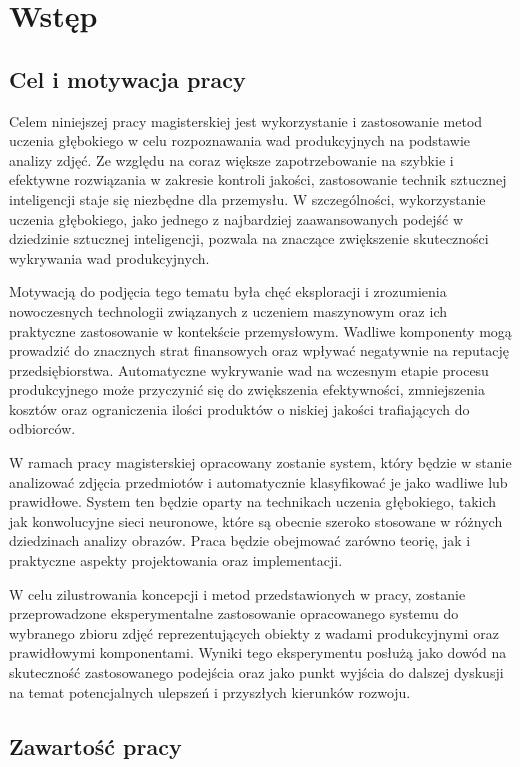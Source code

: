 \chapter{Wstęp}
\section{Cel i motywacja pracy}

Celem niniejszej pracy magisterskiej jest wykorzystanie i zastosowanie metod uczenia głębokiego w celu rozpoznawania wad produkcyjnych na podstawie analizy zdjęć. Ze względu na coraz większe zapotrzebowanie na szybkie i efektywne rozwiązania w zakresie kontroli jakości, zastosowanie technik sztucznej inteligencji staje się niezbędne dla przemysłu. W szczególności, wykorzystanie uczenia głębokiego, jako jednego z najbardziej zaawansowanych podejść w dziedzinie sztucznej inteligencji, pozwala na znaczące zwiększenie skuteczności wykrywania wad produkcyjnych.

Motywacją do podjęcia tego tematu była chęć eksploracji i zrozumienia nowoczesnych technologii związanych z uczeniem maszynowym oraz ich praktyczne zastosowanie w kontekście przemysłowym. Wadliwe komponenty mogą prowadzić do znacznych strat finansowych oraz wpływać negatywnie na reputację przedsiębiorstwa. Automatyczne wykrywanie wad na wczesnym etapie procesu produkcyjnego może przyczynić się do zwiększenia efektywności, zmniejszenia kosztów oraz ograniczenia ilości produktów o niskiej jakości trafiających do odbiorców.

W ramach pracy magisterskiej opracowany zostanie system, który będzie w stanie analizować zdjęcia przedmiotów i automatycznie klasyfikować je jako wadliwe lub prawidłowe. System ten będzie oparty na technikach uczenia głębokiego, takich jak konwolucyjne sieci neuronowe, które są obecnie szeroko stosowane w różnych dziedzinach analizy obrazów. Praca będzie obejmować zarówno teorię, jak i praktyczne aspekty projektowania oraz implementacji.

W celu zilustrowania koncepcji i metod przedstawionych w pracy, zostanie przeprowadzone eksperymentalne zastosowanie opracowanego systemu do wybranego zbioru zdjęć reprezentujących obiekty z wadami produkcyjnymi oraz prawidłowymi komponentami. Wyniki tego eksperymentu posłużą jako dowód na skuteczność zastosowanego podejścia oraz jako punkt wyjścia do dalszej dyskusji na temat potencjalnych ulepszeń i przyszłych kierunków rozwoju.

\section{Zawartość pracy}

